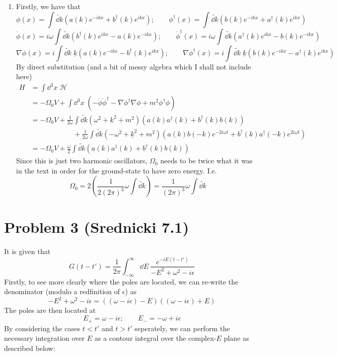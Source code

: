 \documentclass[12pt]{article}
\newcommand{\fullint}{\int_{-\infty}^\infty}
\newcommand{\fullintd}[1]{\fullint\dd#1\:}
\begin{document}
\begin{enumerate}[label=(\alph*)]
    \item Firstly, we have that
    \[ \phi(x) = \int\tilde{\dd k} \left(a(k)e^{-ikx} + b^\dag(k)e^{ikx}\right); \qquad \phi^\dag(x) = \int\tilde{\dd k}\left(b(k)e^{-ikx} + a^\dag(k)e^{ikx}\right) \]
    \[ \dot{\phi}(x) = i\omega\int\tilde{\dd k} \left(b^\dag(k)e^{ikx} - a(k)e^{-ikx}\right); \qquad \dot{\phi}^\dag(x) = i\omega\int\tilde{\dd k}\left(a^\dag(k)e^{ikx} - b(k)e^{-ikx}\right) \]
    \[ \nabla\phi(x) = i\int\tilde{\dd k}\; \underline{k} \left(a(k)e^{-ikx} - b^\dag(k)e^{ikx}\right); \qquad \nabla\phi^\dag(x) = i\int\tilde{\dd k} \; \underline{k} \left(b(k)e^{-ikx} - a^\dag(k)e^{ikx}\right) \]
    By direct substitution (and a bit of messy algebra which I shall not include here)
    \begin{align*}
        H &= \int\dd^3x\;\mathcal{H} \\
        &= -\Omega_0V + \int\dd^3x \; \left(-\dot{\phi}\dot{\phi}^\dag - \nabla\phi^\dag\nabla\phi + m^2\phi^\dag\phi \right) \\
        &= -\Omega_0V + \frac{1}{2\omega}\int\tilde{\dd k} \left(\omega^2 + \underline{k}^2 + m^2\right)\left(a(k)a^\dag(k) + b^\dag(k)b(k)\right) \\
        &\qquad\qquad\qquad + \frac{1}{2\omega}\int\tilde{\dd k}\left(-\omega^2 + \underline{k}^2 + m^2\right)\left(a(k)b(-k)e^{-2i\omega t} + b^\dag(k)a^\dag(-k)e^{2i\omega t}\right) \\
        &= \boxed{-\Omega_0V + \frac{\omega}{2}\int\tilde{\dd k} \left(a(k)a^\dag(k) + b^\dag(k)b(k)\right)}
    \end{align*}
    Since this is just two harmonic oscillators, $\Omega_0$ needs to be twice what it was in the text in order for the ground-state to have zero energy. I.e.
    \[ \Omega_0 = 2 \left(\frac{1}{2(2\pi)^3}\omega\int\tilde{\dd k}\right) = \boxed{\frac{1}{(2\pi)^3}\omega\int\tilde{\dd k}} \]
\end{enumerate}


\section*{Problem 3 \small{(Srednicki 7.1)}}
It is given that
\[ G(t-t') = \frac{1}{2\pi}\fullintd{E}\frac{e^{-iE(t-t')}}{-E^2 + \omega^2 - i\epsilon} \]
Firstly, to see more clearly where the poles are located, we can re-write the denominator (modulo a redfinition of $\epsilon$) as 
\[ -E^2 + \omega^2 - i\epsilon = \left((\omega - i\epsilon) - E\right)\left((\omega - i\epsilon) + E\right) \]
The poles are then located at
\[ E_+ = \omega - i\epsilon; \qquad E_- = -\omega + i\epsilon \]
By considering the cases $t<t'$ and $t>t'$ seperately, we can perform the necessary integration over $E$ as a contour integral over the complex-$E$ plane as described below:
\end{document}
